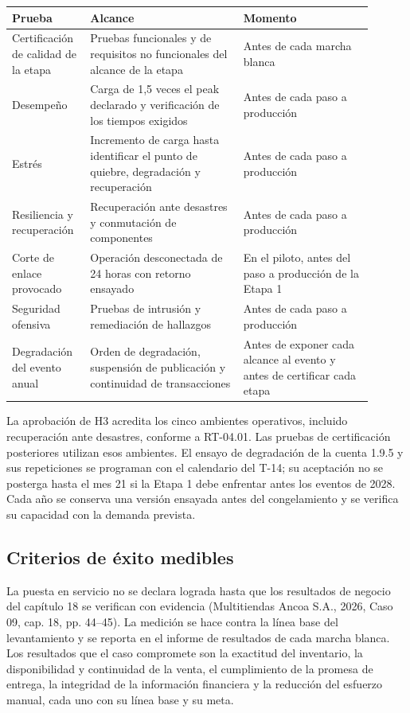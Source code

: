 \documentclass[11pt]{article}
\begin{document}
\begin{longtable}{@{}p{0.176\linewidth}p{0.399\linewidth}p{0.330\linewidth}@{}}
\toprule
\textbf{Prueba} & \textbf{Alcance} & \textbf{Momento} \\
\midrule
\endhead
\bottomrule
\endlastfoot
Certificación de calidad de la etapa & Pruebas funcionales y de requisitos no funcionales del alcance de la etapa & Antes de cada marcha blanca \\
Desempeño & Carga de 1,5 veces el peak declarado y verificación de los tiempos exigidos & Antes de cada paso a producción \\
Estrés & Incremento de carga hasta identificar el punto de quiebre, degradación y recuperación & Antes de cada paso a producción \\
Resiliencia y recuperación & Recuperación ante desastres y conmutación de componentes & Antes de cada paso a producción \\
Corte de enlace provocado & Operación desconectada de 24 horas con retorno ensayado & En el piloto, antes del paso a producción de la Etapa 1 \\
Seguridad ofensiva & Pruebas de intrusión y remediación de hallazgos & Antes de cada paso a producción \\
Degradación del evento anual & Orden de degradación, suspensión de publicación y continuidad de transacciones & Antes de exponer cada alcance al evento y antes de certificar cada etapa \\
\end{longtable}

La aprobación de H3 acredita los cinco ambientes operativos, incluido recuperación ante desastres, conforme a RT-04.01. Las pruebas de certificación posteriores utilizan esos ambientes. El ensayo de degradación de la cuenta 1.9.5 y sus repeticiones se programan con el calendario del T-14; su aceptación no se posterga hasta el mes 21 si la Etapa 1 debe enfrentar antes los eventos de 2028. Cada año se conserva una versión ensayada antes del congelamiento y se verifica su capacidad con la demanda prevista.

\subsection*{Criterios de éxito medibles}

La puesta en servicio no se declara lograda hasta que los resultados de negocio del capítulo 18 se verifican con evidencia (Multitiendas Ancoa S.A., 2026, Caso 09, cap. 18, pp. 44–45). La medición se hace contra la línea base del levantamiento y se reporta en el informe de resultados de cada marcha blanca. Los resultados que el caso compromete son la exactitud del inventario, la disponibilidad y continuidad de la venta, el cumplimiento de la promesa de entrega, la integridad de la información financiera y la reducción del esfuerzo manual, cada uno con su línea base y su meta.
\end{document}
